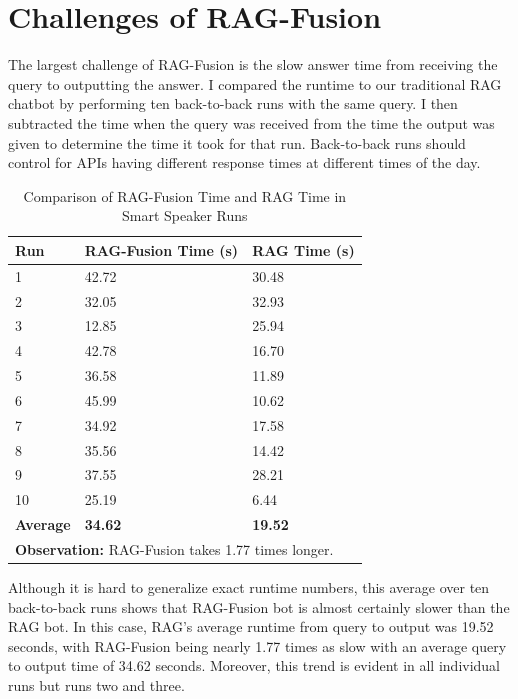 \documentclass{article}
\begin{document}
\section*{Challenges of RAG-Fusion}

The largest challenge of RAG-Fusion is the slow answer time from receiving the query to outputting the answer. I compared the runtime to our traditional RAG chatbot by performing ten back-to-back runs with the same query. I then subtracted the time when the query was received from the time the output was given to determine the time it took for that run. Back-to-back runs should control for APIs having different response times at different times of the day.

\begin{table}[H]
 \caption{Comparison of RAG-Fusion Time and RAG Time in Smart Speaker Runs}
  \centering
  \begin{tabular}{lll}
    \toprule
    Run     & RAG-Fusion Time (s) & RAG Time (s) \\
    \midrule
    1       & 42.72               & 30.48       \\
    2       & 32.05               & 32.93       \\
    3       & 12.85               & 25.94       \\
    4       & 42.78               & 16.70       \\
    5       & 36.58               & 11.89       \\
    6       & 45.99               & 10.62       \\
    7       & 34.92               & 17.58       \\
    8       & 35.56               & 14.42       \\
    9       & 37.55               & 28.21       \\
    10      & 25.19               & 6.44        \\
    \textbf{Average} & \textbf{34.62} & \textbf{19.52} \\
    \multicolumn{3}{l}{\textbf{Observation:} RAG-Fusion takes 1.77 times longer.} \\
    \bottomrule
  \end{tabular}
  \label{tab:rag_comparison}
\end{table}


Although it is hard to generalize exact runtime numbers, this average over ten back-to-back runs shows that RAG-Fusion bot is almost certainly slower than the RAG bot. In this case, RAG's average runtime from query to output was 19.52 seconds, with RAG-Fusion being nearly 1.77 times as slow with an average query to output time of 34.62 seconds. Moreover, this trend is evident in all individual runs but runs two and three.
\end{document}
